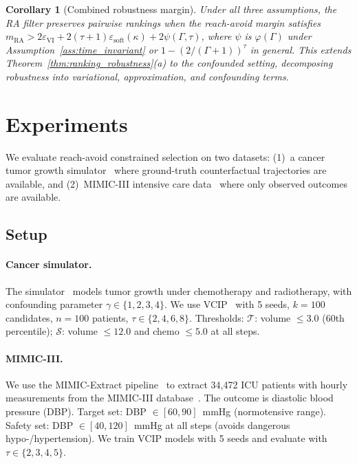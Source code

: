 \documentclass{article}
\newtheorem{corollary}[theorem]{Corollary}
\newcommand{\cT}{\mathcal{T}}
\newcommand{\cS}{\mathcal{S}}
\begin{document}
\begin{corollary}[Combined robustness margin]
\label{cor:combined_margin}
Under all three assumptions, the RA filter preserves pairwise rankings when the reach-avoid margin satisfies $m_{\mathrm{RA}} > 2\varepsilon_{\mathrm{VI}} + 2(\tau+1)\varepsilon_{\mathrm{soft}}(\kappa) + 2\psi(\Gamma, \tau)$, where $\psi$ is $\varphi(\Gamma)$ under Assumption~\ref{ass:time_invariant} or $1 - (2/(\Gamma{+}1))^\tau$ in general. This extends Theorem~\ref{thm:ranking_robustness}(a) to the confounded setting, decomposing robustness into variational, approximation, and confounding terms.
\end{corollary}


\section{Experiments}
\label{sec:experiments}

We evaluate reach-avoid constrained selection on two datasets: (1)~a cancer tumor growth simulator~\citep{bica2020cancer} where ground-truth counterfactual trajectories are available, and (2)~MIMIC-III intensive care data~\citep{johnson2016mimic} where only observed outcomes are available.

\subsection{Setup}
\label{sec:setup}

\vspace{-0.8em}
\paragraph{Cancer simulator.} The simulator~\citep{geng2017cancer, bica2020cancer} models tumor growth under chemotherapy and radiotherapy, with confounding parameter $\gamma \in \{1, 2, 3, 4\}$. We use VCIP~\citep{melnychuk2025vcip} with 5 seeds, $k = 100$ candidates, $n = 100$ patients, $\tau \in \{2, 4, 6, 8\}$. Thresholds: $\cT$: volume $\leq 3.0$ (60th percentile); $\cS$: volume $\leq 12.0$ and chemo $\leq 5.0$ at all steps.

\vspace{-0.8em}
\paragraph{MIMIC-III.} We use the MIMIC-Extract pipeline~\citep{wang2020mimic} to extract 34,472 ICU patients with hourly measurements from the MIMIC-III database~\citep{johnson2016mimic}. The outcome is diastolic blood pressure (DBP). Target set: DBP $\in [60, 90]$~mmHg (normotensive range). Safety set: DBP $\in [40, 120]$~mmHg at all steps (avoids dangerous hypo-/hypertension). We train VCIP models with 5 seeds and evaluate with $\tau \in \{2, 3, 4, 5\}$.
\end{document}
